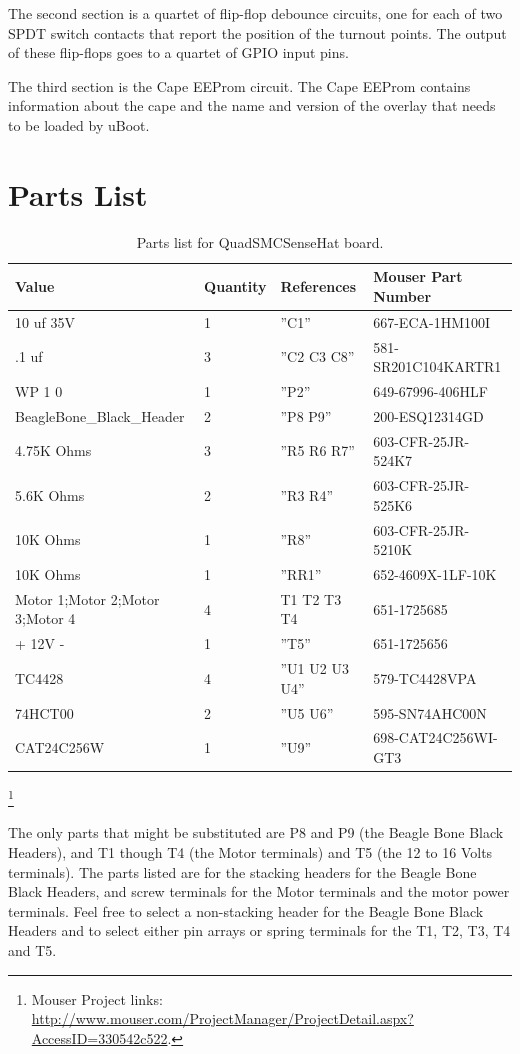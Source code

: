 The second section is a quartet of flip-flop debounce circuits, one for each
of two SPDT switch contacts that report the position of the turnout points.
The output of these flip-flops goes to a quartet of GPIO input pins.

The third section is the Cape EEProm circuit.  The Cape EEProm contains 
information about the cape and the name and version of the overlay that needs 
to be loaded by uBoot.

\section{Parts List}

\begin{table}[htdp]
\begin{centering}\begin{tabular}{|l|l|p{1in}|l|}
\hline
Value&Quantity&References&Mouser Part Number \\
\hline
10 uf 35V&1&''C1''&667-ECA-1HM100I \\
\hline
.1 uf&3&''C2 C3 C8''&581-SR201C104KARTR1 \\
\hline
WP 1 0&1&''P2''&649-67996-406HLF \\
\hline
BeagleBone\_Black\_Header&2&''P8 P9''&200-ESQ12314GD \\
\hline
4.75K Ohms&3&''R5 R6 R7''&603-CFR-25JR-524K7 \\
\hline 
5.6K Ohms&2&''R3 R4''&603-CFR-25JR-525K6 \\
\hline
10K Ohms&1&''R8''&603-CFR-25JR-5210K \\
\hline
10K Ohms&1&''RR1''&652-4609X-1LF-10K \\
\hline
Motor 1;Motor 2;Motor 3;Motor 4&4&T1 T2 T3 T4&651-1725685 \\
\hline
+ 12V -&1&''T5''&651-1725656 \\
\hline
TC4428&4&''U1 U2 U3 U4''&579-TC4428VPA \\
\hline
74HCT00&2&''U5 U6''&595-SN74AHC00N \\
\hline
CAT24C256W&1&''U9''&698-CAT24C256WI-GT3 \\
\hline
\end{tabular}
\caption{Parts list for QuadSMCSenseHat board.}
\end{centering}\end{table}\footnote{Mouser Project links: 
\url{http://www.mouser.com/ProjectManager/ProjectDetail.aspx?AccessID=330542c522}.}


The only parts that might be substituted are P8 and P9 (the Beagle Bone Black
Headers), and T1 though T4 (the Motor terminals) and T5 (the 12 to 16 Volts
terminals). The parts listed are for the stacking headers for the Beagle Bone
Black Headers, and screw terminals for the Motor terminals and the motor power
terminals. Feel free to select a non-stacking header for the Beagle Bone Black
Headers and to select either pin arrays or spring terminals for the T1, T2,
T3, T4 and T5.

